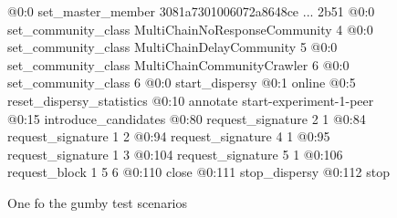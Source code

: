 \begin{figure}
\begin{FVerbatim}[fontsize=\small]
@0:0 set_master_member 3081a7301006072a8648ce ... 2b51
@0:0 set_community_class MultiChainNoResponseCommunity {4}
@0:0 set_community_class MultiChainDelayCommunity {5}
@0:0 set_community_class MultiChainCommunityCrawler {6}
@0:0 set_community_class  {6}
@0:0 start_dispersy
@0:1 online
@0:5 reset_dispersy_statistics
@0:10 annotate start-experiment-1-peer
@0:15 introduce_candidates
@0:80 request_signature 2 {1}
@0:84 request_signature 1 {2}
@0:94 request_signature 4 {1}
@0:95 request_signature 1 {3}
@0:104 request_signature 5 {1}
@0:106 request_block 1 5 {6}
@0:110 close
@0:111 stop_dispersy
@0:112 stop
\end{FVerbatim}
    \caption{One fo the gumby test scenarios}
    \label{fig:exp-gumby-scenario}
\end{figure}
